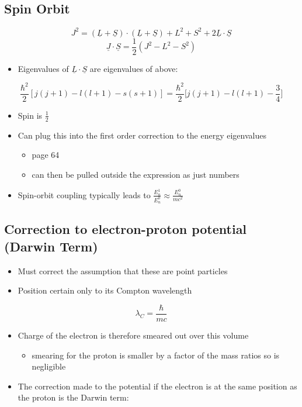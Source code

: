 \documentclass[a4paper,11pt,normalem]{article}
\begin{document}
\subsection{Spin Orbit}\label{spin-orbit}

\[
    J^2 = (\underline{L} + \underline{S})\cdot(\underline{L} + \underline{S}) + L^2 + S^2 + 2\underline{L}\cdot\underline{S} \]
\[
    \underline{J}\cdot\underline{S} = \frac{1}{2}(J^2 - L^2 - S^2)
\]

\begin{itemize}
\item
  Eigenvalues of \(\underline{L}\cdot\underline{S}\) are eigenvalues of
  above:
\end{itemize}

\[
    \frac{\hbar^2}{2}[j(j+1) - l(l+1) - s(s + 1)] = \frac{\hbar^2}{2}\bigg[j(j+1) - l(l+1) - \frac{3}{4}\bigg]
\]

\begin{itemize}
\item
  Spin is \(\frac{1}{2}\)
\item
  Can plug this into the first order correction to the energy
  eigenvalues
  \begin{itemize}
  \item
    page 64
  \item
    can then be pulled outside the expression as just numbers
  \end{itemize}
\item
  Spin-orbit coupling typically leads to
  \(\frac{E_n^1}{E_n^0} \approx \frac{E_n^0}{mc^2}\)
\end{itemize}

\subsection{Correction to electron-proton potential (Darwin Term)}\label{correction-to-electron-proton-potential-darwin-term}

\begin{itemize}

\item
  Must correct the assumption that these are point particles
\item
  Position certain only to its Compton wavelength
\end{itemize}

\[
    \lambda_C = \frac{\hbar}{mc}
\]

\begin{itemize}
\item
  Charge of the electron is therefore smeared out over this volume
  \begin{itemize}
  \item
    smearing for the proton is smaller by a factor of the mass ratios so
    is negligible
  \end{itemize}
\item
  The correction made to the potential if the electron is at the same
  position as the proton is the Darwin term:
\end{itemize}
\end{document}
